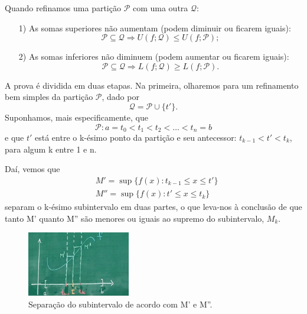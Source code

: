 \documentclass[../analysisII_notes.tex]{subfiles}
\begin{document}
\begin{theorem*}
	Quando refinamos uma partição \(\mathcal{P}\) com uma outra \(\mathcal{Q}\):
	\begin{itemize}
		\item[1)] As somas superiores não aumentam (podem diminuir ou ficarem iguais):
		      \[
			      \mathcal{P}\subseteq \mathcal{Q}\Rightarrow U(f; \mathcal{Q})\leq U(f; \mathcal{P});
		      \]
		\item[2)] As somas inferiores não diminuem (podem aumentar ou ficarem iguais):
		      \[
			      \mathcal{P}\subseteq \mathcal{Q}\Rightarrow L(f; \mathcal{Q})\geq L(f; \mathcal{P}).
		      \]

	\end{itemize}
\end{theorem*}
\begin{proof*}
	A prova é dividida em duas etapas. Na primeira, olharemos para um refinamento bem simples da partição \(\mathcal{P}\), dado por
	\[
		\mathcal{Q} = \mathcal{P}\cup \{t'\}.
	\]
	Suponhamos, mais especificamente, que
	\[
		\mathcal{P}:a = t_{0} < t_{1} < t_2 < \dotsc < t_{n} = b
	\]
	e que \(t'\) está entre o k-ésimo ponto da partição e seu antecessor: \(t_{k-1}<t'<t_{k}\), para algum k entre 1 e n.

	Daí, vemos que
	\begin{align*}
		 & M' = \sup_{}\{f(x): t_{k-1}\leq x \leq t'\} \\
		 & M'' = \sup_{}\{f(x):t' \leq x \leq t_{k}\}
	\end{align*}
	separam o k-ésimo subintervalo em duas partes, o que leva-nos à conclusão de que tanto M' quanto M'' são menores ou iguais ao supremo do subintervalo, \(M_{k}\).

	\begin{figure}[H]
		\begin{center}
			\includegraphics[height=0.4\textheight, width=0.4\textwidth, keepaspectratio]{./Images/proof_i_03.png}
		\end{center}
		\caption{Separação do subintervalo de acordo com M' e M''.}
		\label{proofimg03}
	\end{figure}


\end{proof*}
\end{document}

